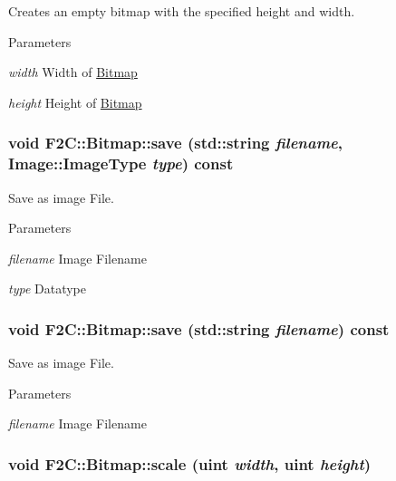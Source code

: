 Creates an empty bitmap with the specified height and width. 
\begin{DoxyParams}{Parameters}
\item[{\em width}]Width of \hyperlink{class_f2_c_1_1_bitmap}{Bitmap} \item[{\em height}]Height of \hyperlink{class_f2_c_1_1_bitmap}{Bitmap} \end{DoxyParams}
\hypertarget{class_f2_c_1_1_bitmap_aa31db41325bf9cf8e82c72bf407f1026}{
\subsubsection[{save}]{\setlength{\rightskip}{0pt plus 5cm}void F2C::Bitmap::save (std::string {\em filename}, \/  Image::ImageType {\em type}) const}}
\label{class_f2_c_1_1_bitmap_aa31db41325bf9cf8e82c72bf407f1026}


Save as image File. 
\begin{DoxyParams}{Parameters}
\item[{\em filename}]Image Filename \item[{\em type}]Datatype \end{DoxyParams}
\hypertarget{class_f2_c_1_1_bitmap_af298fcc1f31a045503a0fa8ac6ff9b8b}{
\subsubsection[{save}]{\setlength{\rightskip}{0pt plus 5cm}void F2C::Bitmap::save (std::string {\em filename}) const}}
\label{class_f2_c_1_1_bitmap_af298fcc1f31a045503a0fa8ac6ff9b8b}


Save as image File. 
\begin{DoxyParams}{Parameters}
\item[{\em filename}]Image Filename \end{DoxyParams}
\hypertarget{class_f2_c_1_1_bitmap_aad1cdb8e6ce4ba8d5bc75123f7fee59a}{
\subsubsection[{scale}]{\setlength{\rightskip}{0pt plus 5cm}void F2C::Bitmap::scale ({\bf uint} {\em width}, \/  {\bf uint} {\em height})}}
\label{class_f2_c_1_1_bitmap_aad1cdb8e6ce4ba8d5bc75123f7fee59a}


